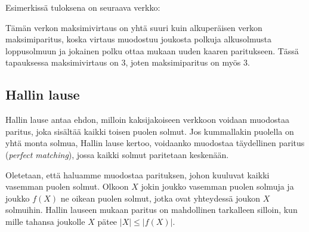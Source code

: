 Esimerkissä tuloksena on seuraava verkko:

\begin{center}
\end{center}

Tämän verkon maksimivirtaus on yhtä suuri kuin
alkuperäisen verkon maksimiparitus,
koska virtaus muodostuu joukosta polkuja
alkusolmusta loppusolmuun ja jokainen
polku ottaa mukaan uuden kaaren paritukseen.
Tässä tapauksessa maksimivirtaus on 3,
joten maksimiparitus on myös 3.

\subsection{Hallin lause}

Hallin lause antaa ehdon, milloin kaksijakoiseen
verkkoon voidaan muodostaa paritus,
joka sisältää kaikki toisen puolen solmut.
Jos kummallakin puolella on yhtä monta solmua,
Hallin lause kertoo, voidaanko muodostaa
täydellinen paritus (\textit{perfect matching}),
jossa kaikki solmut paritetaan keskenään.

Oletetaan, että haluamme muodostaa parituksen,
johon kuuluvat kaikki vasemman puolen solmut.
Olkoon $X$ jokin joukko vasemman puolen solmuja
ja joukko $f(X)$ ne oikean puolen solmut,
jotka ovat yhteydessä joukon $X$ solmuihin.
Hallin lauseen mukaan paritus on mahdollinen
tarkalleen silloin,
kun mille tahansa joukolle $X$ pätee $|X| \le |f(X)|$.

